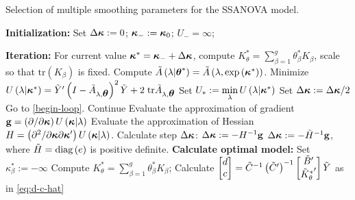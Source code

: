 \begin{algorithm}[H]
\caption{Selection of multiple smoothing parameters for the SSANOVA model.}\label{alg:SSANOVA-algorithm}
\begin{algorithmic}[1]
\State \textbf{Initialization:} 
	\State Set $\Delta \mbox{\boldmath $\kappa$} := 0$; \;$\mbox{\boldmath $\kappa$}_{-}:=\mbox{\boldmath $\kappa$}_{0}$; \;$U_- = \infty$;

\State \textbf{Iteration:} 
		\State For current value $\mbox{\boldmath $\kappa$}^* = \mbox{\boldmath $\kappa$}_- + \Delta \mbox{\boldmath $\kappa$}$, compute $K^*_\theta = \sum_{\beta = 1}^g \theta^*_\beta K_\beta$, scale so that $\mbox{tr}\left(K_\beta\right)$ is fixed. \label{begin-loop}
		\State Compute $\tilde{A}\left(\lambda \vert \mbox{\boldmath $\theta$}^* \right) = \tilde{A}\left(\lambda, \exp\left({\mbox{\boldmath $\kappa$}^*} \right)\right)$.
		\State Minimize $U\left(\lambda \vert \mbox{\boldmath $\kappa$}^* \right) =  \tilde{Y}'\left( I - \tilde{A}_{\lambda,\mbox{\boldmath $\theta$}} \right)^2\tilde{Y} + 2\;\mbox{tr}\tilde{A}_{\lambda,\mbox{\boldmath $\theta$}} $
		\State Set $U_* := \min \limits_\lambda U\left( \lambda \vert \mbox{\boldmath $\kappa$}^* \right) $
		 		\State Set $\Delta \mbox{\boldmath $\kappa$} := \Delta \mbox{\boldmath $\kappa$}/2$
		 		\State Go to \ref{begin-loop}.
		\Else
		\State Continue
		\EndIf
		\State Evaluate the approximation of gradient $\mathbf{g} = \left(\partial /\partial \mbox{\boldmath $\kappa$}\right) U\left(\mbox{\boldmath $\kappa$} \vert \lambda\right)$
		\State Evaluate the approximation of Hessian $H = \left(\partial^2 /\partial \mbox{\boldmath $\kappa$}\partial \mbox{\boldmath $\kappa$}' \right) U\left(\mbox{\boldmath $\kappa$} \vert \lambda\right)$.
		\State Calculate step $\Delta \mbox{\boldmath $\kappa$}$:
				\State $\Delta \mbox{\boldmath $\kappa$} := -H^{-1} \mathbf{g}$
			\Else
				\State $\Delta \mbox{\boldmath $\kappa$} := -\tilde{H}^{-1} \mathbf{g}$, where $\tilde{H} = \textup{diag}\left(e\right)$ is positive definite. \label{ensure-hessian-PD}
			\EndIf
	\EndWhile
\State \textbf{Calculate optimal model:} 
		\State Set $\kappa^*_{\beta} := -\infty$
	\EndIf
	\State Compute $K^*_\theta = \sum_{\beta = 1}^g \theta^*_{\beta} K_\beta$;
	\State Calculate $\begin{bmatrix} d \\ c \end{bmatrix} = \tilde{C}^{-1} \left(\tilde{C}'\right)^{-1} \begin{bmatrix} \tilde{B}' \\ {\tilde{K}^*_\theta}' \end{bmatrix} \tilde{Y}$ as in \eqref{eq:d-c-hat}
	\end{algorithmic}
\end{algorithm}

